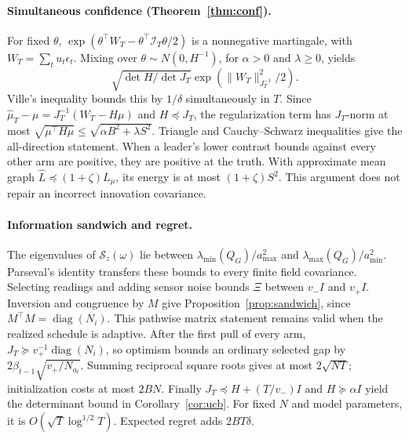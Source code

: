 \documentclass[sigconf,review,anonymous]{acmart}
\newcommand{\diag}{\operatorname{diag}}
\newcommand{\I}{\mathcal{I}}
\begin{document}
\paragraph{Simultaneous confidence (Theorem~\ref{thm:conf}).}
For fixed $\theta$, $\exp(\theta^\top W_T-\theta^\top\I_T\theta/2)$ is a nonnegative martingale, with $W_T=\sum_tu_t\epsilon_t$. Mixing over $\theta\sim N(0,H^{-1})$, for $\alpha>0$ and $\lambda\ge0$, yields
\[
\sqrt{\det H/\det J_T}\exp(\|W_T\|_{J_T^{-1}}^2/2).
\]
Ville's inequality bounds this by $1/\delta$ simultaneously in $T$. Since $\hat\mu_T-\mu=J_T^{-1}(W_T-H\mu)$ and $H\preceq J_T$, the regularization term has $J_T$-norm at most $\sqrt{\mu^\top H\mu}\le\sqrt{\alpha B^2+\lambda S^2}$. Triangle and Cauchy--Schwarz inequalities give the all-direction statement. When a leader's lower contrast bounds against every other arm are positive, they are positive at the truth. With approximate mean graph $\hat L\preceq(1+\zeta)L_\mu$, its energy is at most $(1+\zeta)S^2$. This argument does not repair an incorrect innovation covariance.

\paragraph{Information sandwich and regret.}
The eigenvalues of $\mathcal S_z(\omega)$ lie between $\lambda_{\min}(Q_G)/a_{\max}^2$ and $\lambda_{\max}(Q_G)/a_{\min}^2$. Parseval's identity transfers these bounds to every finite field covariance. Selecting readings and adding sensor noise bounds $\Xi$ between $v_-I$ and $v_+I$. Inversion and congruence by $M$ give Proposition~\ref{prop:sandwich}, since $M^\top M=\diag(N_i)$. This pathwise matrix statement remains valid when the realized schedule is adaptive. After the first pull of every arm, $J_T\succeq v_+^{-1}\diag(N_i)$, so optimism bounds an ordinary selected gap by $2\beta_{t-1}\sqrt{v_+/N_{a_t}}$. Summing reciprocal square roots gives at most $2\sqrt{NT}$; initialization costs at most $2BN$. Finally $J_T\preceq H+(T/v_-)I$ and $H\succeq\alpha I$ yield the determinant bound in Corollary~\ref{cor:ucb}. For fixed $N$ and model parameters, it is $O(\sqrt T\log^{1/2}T)$. Expected regret adds $2BT\delta$.
\end{document}
